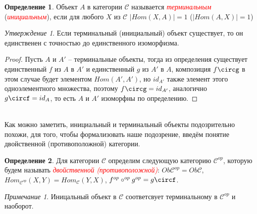 \documentclass[a4paper]{article}
\theoremstyle{indented}
\theoremstyle{definition}
\newtheorem{defn}{Определение}
\theoremstyle{remark}
\newtheorem{remark}{Примечание}
\newtheorem{stat}{Утверждение}
\begin{document}
\begin{defn}
Объект $A$ в категории $\mathcal{C}$ называется
\hypertarget{n3}{\textcolor{red}{\textit{терминальным}}} (\hypertarget{n4}{\textcolor{red}{\textit{инициальным}}}), если для любого $X$ из $\mathcal{C}$ $\vert Hom(X, A)\vert=1$ ($\vert Hom(A, X)\vert=1$)
\end{defn}
\begin{stat}
Если терминальный (инициальный) объект существует, то он единственен с точностью до единственного изоморфизма.
\end{stat}
\begin{proof}
Пусть $A$ и $A'$ -- терминальные объекты, тогда из определения существует единственный $f$ из $A$ в $A'$ и единственный $g$ из $A'$ в $A$, композиция $f\circg$ в этом случае будет элементом $Hom(A', A')$, но $id_{A'}$ также элемент этого одноэлементного множества, поэтому $f\circg = id_{A'}$, аналогично $g\circf = id_{A}$, то есть $A$ и $A'$ изоморфны по определению.
\end{proof}
\\Как можно заметить, инициальный и терминальный объекты подозрительно похожи, для того, чтобы формализовать наше подозрение, введём понятие двойственной (противоположной) категории.
\begin{defn}
Для категории $\mathcal{C}$ определим следующую категорию $\mathcal{C}^{op}$, которую будем называть \hypertarget{n5}{\textcolor{red}{\textit{двойственной (противоположной)}}}: $Ob\mathcal{C}^{op} = Ob\mathcal{C}$, $Hom_{\mathcal{C}^{op}}(X, Y)=Hom_{\mathcal{C}}(Y, X)$, $f^{op}\circ^{op}g^{op} = g\circf$.
\end{defn}
\begin{remark}
Иницальный объект в $\mathcal{C}$ соответсвует терминальному в $\mathcal{C}^{op}$ и наоборот.
\end{remark}
\end{document}
